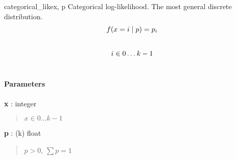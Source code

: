 \hypertarget{pymc.distributions.categorical_like}{}
\begin{funcdesc}{categorical\_like}{x, p}
Categorical log-likelihood. The most general discrete distribution.
\begin{gather}
\begin{split}f(x=i \mid p) = p_i\end{split}\notag\\\begin{split}\end{split}\notag
\end{gather}\begin{gather}
\begin{split}i \in 0 \ldots k-1\end{split}\notag\\\begin{split}\end{split}\notag
\end{gather}
\paragraph{Parameters}
\begin{paramlist}
\item[] \textbf{x} : integer
\begin{quote}
$x \in 0 \ldots k-1$
\end{quote}

\item[]\textbf{p} : (k) float
\begin{quote}
$p > 0$, $\sum p = 1$
\end{quote}
\end{paramlist}
\end{funcdesc}

